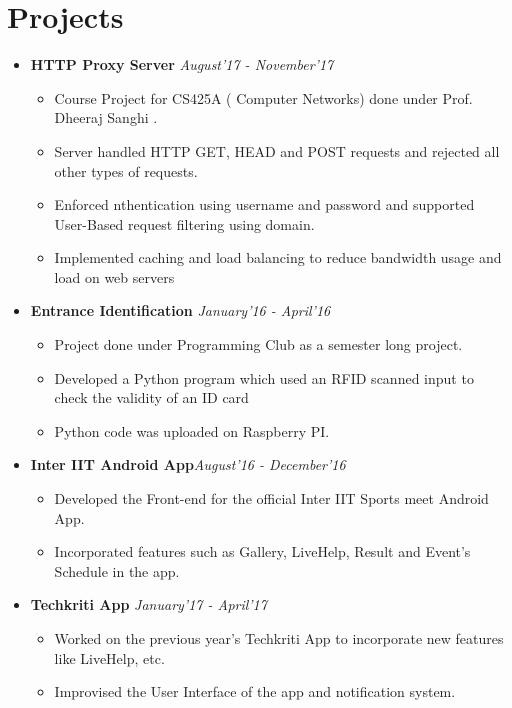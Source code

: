 \documentclass[10pt]{scrbook}
\begin{document}
\section*{Projects}
\begin{itemize}
\item \textbf{HTTP Proxy Server } \hfill\textit{August'17 - November'17}
\begin{itemize}
\item Course Project for CS425A ( Computer Networks) done under Prof. Dheeraj Sanghi .
\item Server handled HTTP GET, HEAD and POST requests and rejected all other types of requests.
\item Enforced nthentication using username and password and supported User-Based request filtering using domain. 
\item Implemented caching and load balancing to reduce bandwidth usage and load on web servers %
\end{itemize}

\item \textbf{Entrance Identification} \hfill\textit{January'16 - April'16}
\begin{itemize}
\item Project done under Programming Club as a semester long project. 
\item Developed a Python program which used an RFID scanned input to check the validity of an ID card
\item Python code was uploaded on Raspberry PI. 
\end{itemize}

\item \textbf{Inter IIT Android App}\hfill\textit{August'16 - December'16}
\begin{itemize}
\item Developed the Front-end for the official Inter IIT Sports meet Android App.
\item Incorporated features such as Gallery, LiveHelp, Result and Event's Schedule in the app. 
\end{itemize}

\item \textbf{Techkriti App} \hfill\textit{January'17 - April'17}
\begin{itemize}
\item Worked on the previous year's Techkriti App to incorporate new features like LiveHelp, etc.
\item Improvised the User Interface of the app and notification system. 
\end{itemize}


\end{itemize}
\end{document}
